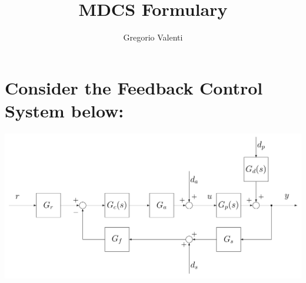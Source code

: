 \documentclass{article}
\title{MDCS Formulary}
\author{Gregorio Valenti}
\date{}
\begin{document}
	
	\section{Consider the Feedback Control System below:}
	\hspace{1cm}
	\includegraphics[scale=0.5]{feedback_control_system.png}
	
\end{document}
